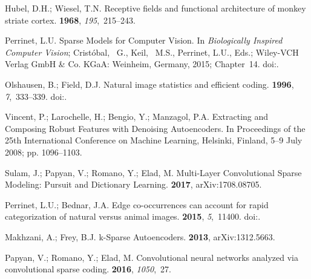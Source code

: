 \documentclass[vision,article,accept,oneauthor,pdftex]{Definitions/mdpi}
\begin{document}
\begin{thebibliography}{999}
\providecommand{\natexlab}[1]{#1}

Hubel, D.H.; Wiesel, T.N.
\newblock Receptive fields and functional architecture of monkey striate
  cortex.
 {\bf 1968}, {\em 195},~215--243.

Perrinet, L.U. Sparse Models for Computer Vision.
\newblock In {\em Biologically Inspired Computer Vision}; Crist{\'{o}}bal,~ G.,
  Keil,~ M.S., Perrinet, L.U., Eds.; Wiley-VCH Verlag GmbH {\&} Co. KGaA: Weinheim, Germany, 2015;
  Chapter~14.
\newblock
  doi:{\href{https://doi.org/10.1002/9783527680863.ch14}{}}.

Olshausen, B.; Field, D.J.
\newblock Natural image statistics and efficient coding.
 {\bf 1996}, {\em
  7},~333--339.
\newblock
  doi:{\href{https://doi.org/10.1038/381607a0}{}}.



Vincent, P.; Larochelle, H.; Bengio, Y.; Manzagol, P.A.
\newblock Extracting and Composing Robust Features with Denoising Autoencoders.
\newblock In  Proceedings of the 25th International Conference on Machine
  Learning,  Helsinki, Finland, 5--9 July 2008; pp. 1096--1103.

Sulam, J.; Papyan, V.; Romano, Y.; Elad, M.
\newblock Multi-Layer Convolutional Sparse Modeling: Pursuit and Dictionary
  Learning.
 {\bf 2017}, arXiv:1708.08705.

Perrinet, L.U.; Bednar, J.A.
\newblock Edge co-occurrences can account for rapid categorization of natural
  versus animal images.
 {\bf 2015}, {\em 5},~11400.
\newblock
  doi:{\href{https://doi.org/10.1038/srep11400}{}}.

Makhzani, A.; Frey, B.J.
\newblock k-Sparse Autoencoders.
 {\bf 2013},  	arXiv:1312.5663.

Papyan, V.; Romano, Y.; Elad, M.
\newblock Convolutional neural networks analyzed via convolutional sparse
  coding.
 {\bf 2016}, {\em 1050},~27.



\end{thebibliography}
\end{document}
